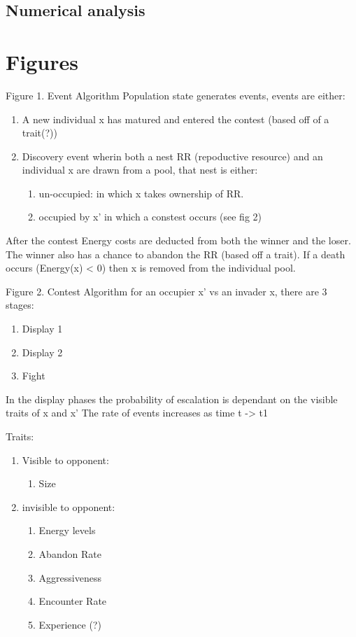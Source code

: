 \documentclass[a4paper,11pt]{article}
\begin{document}
\subsection{Numerical analysis}

\section{Figures}
Figure 1. Event Algorithm
Population state generates events, events are either:
\begin{enumerate}
    \item A new individual x has matured and entered the contest (based off of a trait(?))
    \item Discovery event wherin both a nest RR (repoductive resource) and an individual x are drawn from a pool, that nest is either:
\begin{enumerate}
    \item un-occupied: in which x takes ownership of RR.
    \item occupied by x' in which a constest occurs (see fig 2)
\end{enumerate}
\end{enumerate}
After the contest Energy costs are deducted from both the winner and the loser.
The winner also has a chance to abandon the RR (based off a trait).
If a death occurs (Energy(x) < 0) then x is removed from the individual pool.


Figure 2. Contest Algorithm
for an occupier x' vs an invader x, there are 3 stages:
\begin{enumerate}
    \item Display 1
    \item Display 2
    \item Fight
\end{enumerate}
In the display phases the probability of escalation is dependant on the visible traits of x and x'
The rate of events increases as time t -> t1

Traits:
\begin{enumerate}
    \item Visible to opponent:
\begin{enumerate}
    \item Size
\end{enumerate}
    \item invisible to opponent:
\begin{enumerate}
    \item Energy levels
    \item Abandon Rate
    \item Aggressiveness
    \item Encounter Rate
    \item Experience (?)
\end{enumerate}
\end{enumerate}
\end{document}
